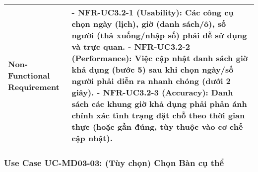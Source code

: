 \begin{longtable}{|m{4cm}|p{11cm}|}
\hline
Non-Functional Requirement & - \textbf{NFR-UC3.2-1 (Usability):} Các công cụ chọn ngày (lịch), giờ (danh sách/ô), số người (thả xuống/nhập số) phải dễ sử dụng và trực quan. \newline - \textbf{NFR-UC3.2-2 (Performance):} Việc cập nhật danh sách giờ khả dụng (bước 5) sau khi chọn ngày/số người phải diễn ra nhanh chóng (dưới 2 giây). \newline - \textbf{NFR-UC3.2-3 (Accuracy):} Danh sách các khung giờ khả dụng phải phản ánh chính xác tình trạng đặt chỗ theo thời gian thực (hoặc gần đúng, tùy thuộc vào cơ chế cập nhật). \\
\hline
\end{longtable}

\subsubsection{Use Case UC-MD03-03: (Tùy chọn) Chọn Bàn cụ thể}

